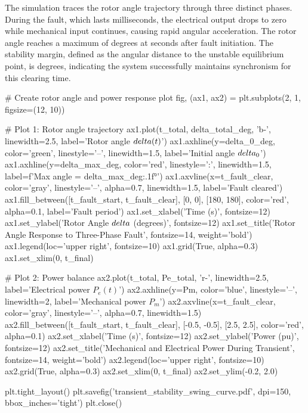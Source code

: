 \documentclass[11pt,a4paper]{article}
\begin{document}
The simulation traces the rotor angle trajectory through three distinct phases. During the fault, which lasts  milliseconds, the electrical output drops to zero while mechanical input continues, causing rapid angular acceleration. The rotor angle reaches a maximum of  degrees at  seconds after fault initiation. The stability margin, defined as the angular distance to the unstable equilibrium point, is  degrees, indicating the system successfully maintains synchronism for this clearing time.

\begin{pycode}
# Create rotor angle and power response plot
fig, (ax1, ax2) = plt.subplots(2, 1, figsize=(12, 10))

# Plot 1: Rotor angle trajectory
ax1.plot(t_total, delta_total_deg, 'b-', linewidth=2.5, label='Rotor angle $\\delta(t)$')
ax1.axhline(y=delta_0_deg, color='green', linestyle='--', linewidth=1.5, label='Initial angle $\\delta_0$')
ax1.axhline(y=delta_max_deg, color='red', linestyle=':', linewidth=1.5, label=f'Max angle = {delta_max_deg:.1f}°')
ax1.axvline(x=t_fault_clear, color='gray', linestyle='--', alpha=0.7, linewidth=1.5, label='Fault cleared')
ax1.fill_between([t_fault_start, t_fault_clear], [0, 0], [180, 180], color='red', alpha=0.1, label='Fault period')
ax1.set_xlabel('Time (s)', fontsize=12)
ax1.set_ylabel('Rotor Angle $\\delta$ (degrees)', fontsize=12)
ax1.set_title('Rotor Angle Response to Three-Phase Fault', fontsize=14, weight='bold')
ax1.legend(loc='upper right', fontsize=10)
ax1.grid(True, alpha=0.3)
ax1.set_xlim(0, t_final)

# Plot 2: Power balance
ax2.plot(t_total, Pe_total, 'r-', linewidth=2.5, label='Electrical power $P_e(t)$')
ax2.axhline(y=Pm, color='blue', linestyle='--', linewidth=2, label='Mechanical power $P_m$')
ax2.axvline(x=t_fault_clear, color='gray', linestyle='--', alpha=0.7, linewidth=1.5)
ax2.fill_between([t_fault_start, t_fault_clear], [-0.5, -0.5], [2.5, 2.5], color='red', alpha=0.1)
ax2.set_xlabel('Time (s)', fontsize=12)
ax2.set_ylabel('Power (pu)', fontsize=12)
ax2.set_title('Mechanical and Electrical Power During Transient', fontsize=14, weight='bold')
ax2.legend(loc='upper right', fontsize=10)
ax2.grid(True, alpha=0.3)
ax2.set_xlim(0, t_final)
ax2.set_ylim(-0.2, 2.0)

plt.tight_layout()
plt.savefig('transient_stability_swing_curve.pdf', dpi=150, bbox_inches='tight')
plt.close()
\end{pycode}
\end{document}
